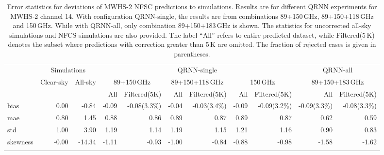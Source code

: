 \documentclass[amt]{copernicus}
\begin{document}
\begin{table}[t]
	\caption{Error statistics for deviations of MWHS-2 NFSC predictions to simulations. Results are for different QRNN experiments for MWHS-2 channel 14. With configuration QRNN-single, the results are from combinations 89+150\,GHz, 89+150+118\,GHz and 150\,GHz. While with QRNN-all, only combination 89+150+183\,GHz is shown. The statistics for uncorrected all-sky simulations and NFCS simulations are also provided. The label ``All'' refers to entire predicted dataset, while Filtered(5\,K) denotes the subset where predictions with correction greater than 5\,K are omitted. The fraction of rejected cases is given in parentheses. }
	\label{tab:error_statistics_mwhs_14}
	\begin{tabular}{lrr|rr|rr|rr|rr}
		\tophline
		&\multicolumn{2}{c|}{Simulations}& \multicolumn{6}{c|}{QRNN-single} & \multicolumn{2}{c}{QRNN-all}\\
		\cline{2-11}
		&   Clear-sky &   All-sky &  \multicolumn{2}{c|}{89+150\,GHz} & \multicolumn{2}{c|}{89+150+118\,GHz} & \multicolumn{2}{c|}{150\,GHz} & \multicolumn{2}{c}{89+150+183\,GHz}\\
		&			   &			& All & Filtered(5K) & All & Filtered(5K) & All & Filtered(5K)  & All & Filtered(5K)\\
		\middlehline
		bias     &  0.00 &  -0.84 & -0.09 & -0.08(3.3\%) & -0.04 & -0.03(3.4\%) & -0.09 & -0.09(3.2\%) & -0.09(3.3\%) & -0.08(3.3\%)  \\
		mae      &  0.80 &   1.45 &  0.88 &  0.86 &  0.89 &  0.87 &  0.89 &  0.87 &  0.62 &  0.59\\
		std      &  1.00 &   3.90 &  1.19 &  1.14 &  1.19 &  1.15 &  1.21 &  1.16 &  0.90 &  0.83\\
		skewness & -0.00 & -14.34 & -1.11 & -0.93 & -1.00 & -0.84 & -0.88 & -0.98 & -1.58 & -1.62\\
		\bottomhline
	\end{tabular}
\end{table}
\end{document}
